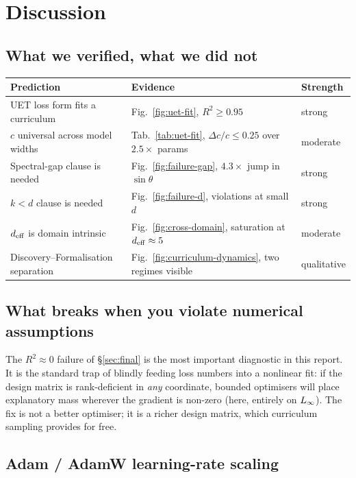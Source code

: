 \section{Discussion}
\label{sec:discussion}

\subsection{What we verified, what we did not}

\begin{center}\small
\begin{tabular}{p{5.5cm}p{6.0cm}l}
\toprule
Prediction & Evidence & Strength \\
\midrule
UET loss form fits a curriculum &
   Fig.~\ref{fig:uet-fit}, $R^2 \geq 0.95$ & strong \\
$c$ universal across model widths &
   Tab.~\ref{tab:uet-fit}, $\Delta c/c \leq 0.25$ over $2.5\times$ params
   & moderate \\
Spectral-gap clause is needed &
   Fig.~\ref{fig:failure-gap}, $4.3\times$ jump in $\sin\theta$ & strong \\
$k < d$ clause is needed &
   Fig.~\ref{fig:failure-d}, violations at small $d$ & strong \\
$d_{\mathrm{eff}}$ is domain intrinsic &
   Fig.~\ref{fig:cross-domain}, saturation at $d_{\mathrm{eff}} \approx 5$ & moderate \\
Discovery--Formalisation separation &
   Fig.~\ref{fig:curriculum-dynamics}, two regimes visible &
   qualitative \\
\bottomrule
\end{tabular}
\end{center}

\subsection{What breaks when you violate numerical assumptions}

The $R^2 \approx 0$ failure of \S\ref{sec:final} is the most important
diagnostic in this report. It is the standard trap of blindly feeding
loss numbers into a nonlinear fit: if the design matrix is
rank-deficient in \emph{any} coordinate, bounded optimisers will place
explanatory mass wherever the gradient is non-zero (here, entirely on
$L_{\infty}$). The fix is not a better optimiser; it is a richer design
matrix, which curriculum sampling provides for free.

\subsection{Adam / AdamW learning-rate scaling}

